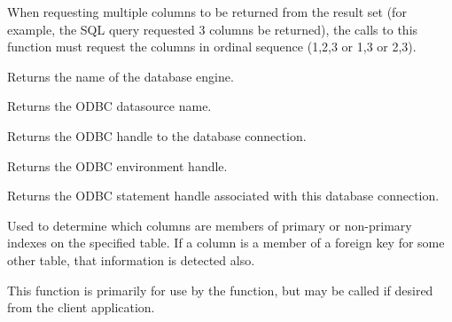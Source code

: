 
When requesting multiple columns to be returned from the result set (for example, the SQL query
requested 3 columns be returned), the calls to this function must request the columns in ordinal
sequence (1,2,3 or 1,3 or 2,3).  

\label{wxdbgetdatabasename}


Returns the name of the database engine.

\label{wxdbgetdatasourcename}


Returns the ODBC datasource name.

\label{wxdbgethdbc}


Returns the ODBC handle to the database connection.

\label{wxdbgethenv}


Returns the ODBC environment handle.

\label{wxdbgethstmt}


Returns the ODBC statement handle associated with this database connection.

\label{wxdbgetkeyfields}


Used to determine which columns are members of primary or non-primary indexes on the specified table.  If a column is a member of a foreign key for some other table, that information is detected also.

This function is primarily for use by the  function, but may be called if desired from the client application.




